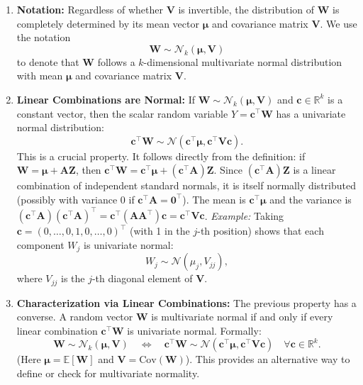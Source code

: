 \documentclass[11pt, letterpaper]{article}
\theoremstyle{plain} %
\theoremstyle{definition} %
\theoremstyle{remark} %
\renewcommand{\mathbf}{\boldsymbol} %
\newcommand{\R}{\mathbb{R}}
\newcommand{\E}{\mathbb{E}}
\newcommand{\Cov}{\mathrm{Cov}} %
\newcommand{\Normal}{\mathcal{N}}
\begin{document}
\begin{enumerate}
    \item \textbf{Notation:} Regardless of whether $\boldsymbol{V}$ is invertible, the distribution of $\boldsymbol{W}$ is completely determined by its mean vector $\boldsymbol{\mu}$ and covariance matrix $\boldsymbol{V}$. We use the notation
    \[
    \boldsymbol{W} \sim \Normal_k(\boldsymbol{\mu}, \boldsymbol{V})
    \]
    to denote that $\boldsymbol{W}$ follows a $k$-dimensional multivariate normal distribution with mean $\boldsymbol{\mu}$ and covariance matrix $\boldsymbol{V}$.

    \item \textbf{Linear Combinations are Normal:} If $\boldsymbol{W} \sim \Normal_k(\boldsymbol{\mu}, \boldsymbol{V})$ and $\boldsymbol{c} \in \R^k$ is a constant vector, then the scalar random variable $Y = \boldsymbol{c}^{\top}\boldsymbol{W}$ has a univariate normal distribution:
    \[
    \boldsymbol{c}^{\top}\boldsymbol{W} \sim \Normal(\boldsymbol{c}^{\top}\boldsymbol{\mu}, \boldsymbol{c}^{\top}\boldsymbol{V}\boldsymbol{c}).
    \]
    This is a crucial property. It follows directly from the definition: if $\boldsymbol{W} = \boldsymbol{\mu} + \boldsymbol{A}\boldsymbol{Z}$, then $\boldsymbol{c}^{\top}\boldsymbol{W} = \boldsymbol{c}^{\top}\boldsymbol{\mu} + (\boldsymbol{c}^{\top}\boldsymbol{A})\boldsymbol{Z}$. Since $(\boldsymbol{c}^{\top}\boldsymbol{A})\boldsymbol{Z}$ is a linear combination of independent standard normals, it is itself normally distributed (possibly with variance 0 if $\boldsymbol{c}^{\top}\boldsymbol{A}=\mathbf{0}^{\top}$). The mean is $\boldsymbol{c}^{\top}\boldsymbol{\mu}$ and the variance is $(\boldsymbol{c}^{\top}\boldsymbol{A})(\boldsymbol{c}^{\top}\boldsymbol{A})^{\top} = \boldsymbol{c}^{\top}(\boldsymbol{A}\boldsymbol{A}^{\top})\boldsymbol{c} = \boldsymbol{c}^{\top}\boldsymbol{V}\boldsymbol{c}$.
    \textit{Example:} Taking $\boldsymbol{c} = (0, \ldots, 0, 1, 0, \ldots, 0)^{\top}$ (with 1 in the $j$-th position) shows that each component $W_j$ is univariate normal:
    \[ W_j \sim \Normal(\mu_j, V_{jj}), \]
    where $V_{jj}$ is the $j$-th diagonal element of $\boldsymbol{V}$.

    \item \textbf{Characterization via Linear Combinations:} The previous property has a converse. A random vector $\boldsymbol{W}$ is multivariate normal if and only if every linear combination $\boldsymbol{c}^{\top}\boldsymbol{W}$ is univariate normal. Formally:
    \[
    \boldsymbol{W} \sim \Normal_k(\boldsymbol{\mu}, \boldsymbol{V}) \quad \Longleftrightarrow \quad \boldsymbol{c}^{\top}\boldsymbol{W} \sim \Normal(\boldsymbol{c}^{\top}\boldsymbol{\mu}, \boldsymbol{c}^{\top}\boldsymbol{V}\boldsymbol{c}) \quad \forall \boldsymbol{c} \in \R^k.
    \]
    (Here $\boldsymbol{\mu} = \E[\boldsymbol{W}]$ and $\boldsymbol{V} = \Cov(\boldsymbol{W})$). This provides an alternative way to define or check for multivariate normality.


\end{enumerate}
\end{document}
